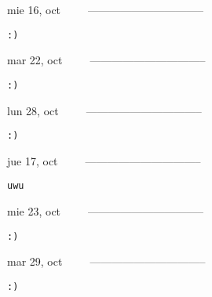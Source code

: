 \documentclass[letterpaper,10pt]{article}
\begin{document}
\begin{multicols}{3}
{mie 16, oct\ \ \ \ \ --------------------------------}
\begin{flushright}\begin{small}\texttt{:)}\end{small}\end{flushright}
\vfill
{mar 22, oct\ \ \ \ \ --------------------------------}
\begin{flushright}\begin{small}\texttt{:)}\end{small}\end{flushright}\par
\vfill
{lun 28, oct\ \ \ \ \ --------------------------------}
\begin{flushright}\begin{small}\texttt{:)}\end{small}\end{flushright}\par
\vfill
\end{multicols}
\vspace{1.05cm}

\begin{multicols}{3}
{jue 17, oct\ \ \ \ \ --------------------------------}
\begin{flushright}\begin{small}\texttt{uwu}\end{small}\end{flushright}
\vfill
{mie 23, oct\ \ \ \ \ --------------------------------}
\begin{flushright}\begin{small}\texttt{:)}\end{small}\end{flushright}\par
\vfill
{mar 29, oct\ \ \ \ \ --------------------------------}
\begin{flushright}\begin{small}\texttt{:)}\end{small}\end{flushright}\par
\vfill
\end{multicols}
\vspace{1.05cm}
\end{document}
